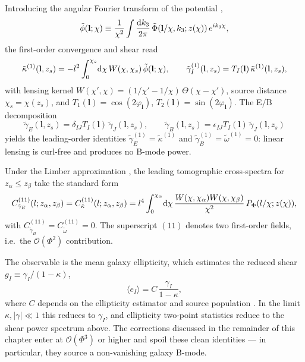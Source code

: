 \documentclass[11pt]{book}
\DeclareRobustCommand{\d}{\ifmmode\text{d}\else d\fi}
\begin{document}
Introducing the angular Fourier transform of the potential \cite{2005PhRvD..72h3001D},
\begin{equation}
    \tilde{\phi}(\mathbf{l};\chi) \equiv \frac{1}{\chi^2}\int\frac{\d k_3}{2\pi}\,\tilde{\Phi}(\mathbf{l}/\chi,k_3;z(\chi))\,e^{ik_3\chi},
\end{equation}
the first-order convergence and shear read
\begin{equation}
    \tilde{\kappa}^{(1)}(\mathbf{l},z_s) = -l^2\int_0^{\chi_s}\!\d\chi\, W(\chi,\chi_s)\,\tilde{\phi}(\mathbf{l};\chi),\qquad \tilde{\gamma}_I^{(1)}(\mathbf{l},z_s) = T_I(\mathbf{l})\,\tilde{\kappa}^{(1)}(\mathbf{l},z_s),
\end{equation}
with lensing kernel $W(\chi',\chi) = (1/\chi' - 1/\chi)\,\Theta(\chi-\chi')$, source distance $\chi_s = \chi(z_s)$, and $T_1(\mathbf{l}) = \cos(2\varphi_\mathbf{l})$, $T_2(\mathbf{l}) = \sin(2\varphi_\mathbf{l})$. The E/B decomposition
\begin{equation}
    \tilde{\gamma}_E(\mathbf{l},z_s) = \delta_{IJ}T_I(\mathbf{l})\,\tilde{\gamma}_J(\mathbf{l},z_s),\qquad \tilde{\gamma}_B(\mathbf{l},z_s) = \epsilon_{IJ}T_I(\mathbf{l})\,\tilde{\gamma}_J(\mathbf{l},z_s)
\end{equation}
yields the leading-order identities $\tilde{\gamma}_E^{(1)} = \tilde{\kappa}^{(1)}$ and $\tilde{\gamma}_B^{(1)} = \tilde{\omega}^{(1)} = 0$: linear lensing is curl-free and produces no B-mode power.

Under the Limber approximation \cite{1992ApJ...388..272K}, the leading tomographic cross-spectra for $z_\alpha \le z_\beta$ take the standard form
\begin{equation}
    C^{(11)}_{\tilde{\gamma}_E}(l;z_\alpha,z_\beta) = C^{(11)}_{\tilde{\kappa}}(l;z_\alpha,z_\beta) = l^4\int_0^{\chi_\alpha}\!\d\chi\,\frac{W(\chi,\chi_\alpha)W(\chi,\chi_\beta)}{\chi^2}\,P_\Phi(l/\chi;z(\chi)),
\end{equation}
with $C^{(11)}_{\tilde{\gamma}_B} = C^{(11)}_{\tilde{\omega}} = 0$. The superscript $(11)$ denotes two first-order fields, i.e.\ the $\mathcal{O}(\Phi^2)$ contribution.

The observable is the mean galaxy ellipticity, which estimates the reduced shear $g_I \equiv \gamma_I/(1-\kappa)$,
\begin{equation}
    \langle e_I\rangle = C\,\frac{\gamma_I}{1-\kappa},
    \label{eq:ellipticity_reduced_shear}
\end{equation}
where $C$ depends on the ellipticity estimator and source population \cite{1995A&A...294..411S,1997A&A...318..687S}. In the limit $\kappa, |\gamma| \ll 1$ this reduces to $\gamma_I$, and ellipticity two-point statistics reduce to the shear power spectrum above. The corrections discussed in the remainder of this chapter enter at $\mathcal{O}(\Phi^3)$ or higher and spoil these clean identities --- in particular, they source a non-vanishing galaxy B-mode.
\end{document}
